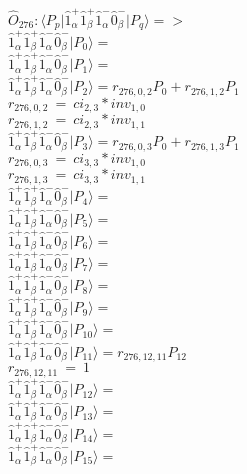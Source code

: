\documentclass[14pt]{article}
\begin{document}
    $\hat{O}_{276}:  \langle{P_p}\vert \hat{1}_{\alpha}^{+}\hat{1}_{\beta}^{+}\hat{1}_{\alpha}^{-}\hat{0}_{\beta}^{-} \vert{P_q}\rangle => $ \\ 
    $ \hat{1}_{\alpha}^{+}\hat{1}_{\beta}^{+}\hat{1}_{\alpha}^{-}\hat{0}_{\beta}^{-} \vert{P_{0}}\rangle =  $ \\ 
    $ \hat{1}_{\alpha}^{+}\hat{1}_{\beta}^{+}\hat{1}_{\alpha}^{-}\hat{0}_{\beta}^{-} \vert{P_{1}}\rangle =  $ \\ 
    $ \hat{1}_{\alpha}^{+}\hat{1}_{\beta}^{+}\hat{1}_{\alpha}^{-}\hat{0}_{\beta}^{-} \vert{P_{2}}\rangle = {r}_{276,0,2}P_{0}+{r}_{276,1,2}P_{1} $ \\ 
    ${r}_{276,0,2}\ =\ {ci}_{2,3}*{inv}_{1,0} $ \\ 
    ${r}_{276,1,2}\ =\ {ci}_{2,3}*{inv}_{1,1} $ \\ 
    $ \hat{1}_{\alpha}^{+}\hat{1}_{\beta}^{+}\hat{1}_{\alpha}^{-}\hat{0}_{\beta}^{-} \vert{P_{3}}\rangle = {r}_{276,0,3}P_{0}+{r}_{276,1,3}P_{1} $ \\ 
    ${r}_{276,0,3}\ =\ {ci}_{3,3}*{inv}_{1,0} $ \\ 
    ${r}_{276,1,3}\ =\ {ci}_{3,3}*{inv}_{1,1} $ \\ 
    $ \hat{1}_{\alpha}^{+}\hat{1}_{\beta}^{+}\hat{1}_{\alpha}^{-}\hat{0}_{\beta}^{-} \vert{P_{4}}\rangle =  $ \\ 
    $ \hat{1}_{\alpha}^{+}\hat{1}_{\beta}^{+}\hat{1}_{\alpha}^{-}\hat{0}_{\beta}^{-} \vert{P_{5}}\rangle =  $ \\ 
    $ \hat{1}_{\alpha}^{+}\hat{1}_{\beta}^{+}\hat{1}_{\alpha}^{-}\hat{0}_{\beta}^{-} \vert{P_{6}}\rangle =  $ \\ 
    $ \hat{1}_{\alpha}^{+}\hat{1}_{\beta}^{+}\hat{1}_{\alpha}^{-}\hat{0}_{\beta}^{-} \vert{P_{7}}\rangle =  $ \\ 
    $ \hat{1}_{\alpha}^{+}\hat{1}_{\beta}^{+}\hat{1}_{\alpha}^{-}\hat{0}_{\beta}^{-} \vert{P_{8}}\rangle =  $ \\ 
    $ \hat{1}_{\alpha}^{+}\hat{1}_{\beta}^{+}\hat{1}_{\alpha}^{-}\hat{0}_{\beta}^{-} \vert{P_{9}}\rangle =  $ \\ 
    $ \hat{1}_{\alpha}^{+}\hat{1}_{\beta}^{+}\hat{1}_{\alpha}^{-}\hat{0}_{\beta}^{-} \vert{P_{10}}\rangle =  $ \\ 
    $ \hat{1}_{\alpha}^{+}\hat{1}_{\beta}^{+}\hat{1}_{\alpha}^{-}\hat{0}_{\beta}^{-} \vert{P_{11}}\rangle = {r}_{276,12,11}P_{12} $ \\ 
    ${r}_{276,12,11}\ =\ 1 $ \\ 
    $ \hat{1}_{\alpha}^{+}\hat{1}_{\beta}^{+}\hat{1}_{\alpha}^{-}\hat{0}_{\beta}^{-} \vert{P_{12}}\rangle =  $ \\ 
    $ \hat{1}_{\alpha}^{+}\hat{1}_{\beta}^{+}\hat{1}_{\alpha}^{-}\hat{0}_{\beta}^{-} \vert{P_{13}}\rangle =  $ \\ 
    $ \hat{1}_{\alpha}^{+}\hat{1}_{\beta}^{+}\hat{1}_{\alpha}^{-}\hat{0}_{\beta}^{-} \vert{P_{14}}\rangle =  $ \\ 
    $ \hat{1}_{\alpha}^{+}\hat{1}_{\beta}^{+}\hat{1}_{\alpha}^{-}\hat{0}_{\beta}^{-} \vert{P_{15}}\rangle =  $ \\ 
    
\end{document}

